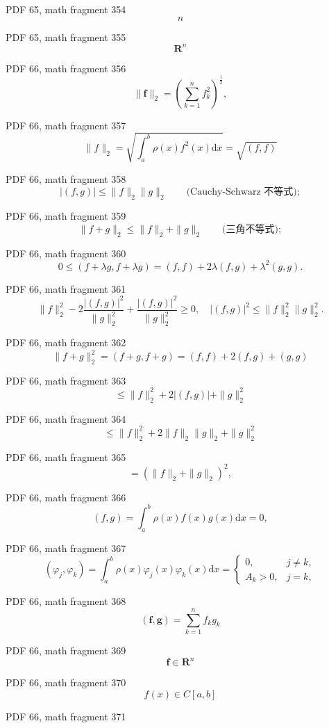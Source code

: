 \documentclass[UTF8,fontset=fandol]{ctexart}
\begin{document}
PDF 65, math fragment 354
\[n\]
\par
PDF 65, math fragment 355
\[\mathbf{R}^n\]
\par
PDF 66, math fragment 356
\[
\| \boldsymbol{f} \|_{2} = \left( \sum_{k=1}^{n} f_{k}^{2} \right)^{\frac{1}{2}},
\]
\par
PDF 66, math fragment 357
\[
\| f \|_{2} = \sqrt{\int_{a}^{b} \rho(x) f^{2}(x) \mathrm{d}x} = \sqrt{(f, f)} \tag{3.3.4}
\]
\par
PDF 66, math fragment 358
\[
|(f,g)|\leqslant\|f\|_2\|g\|_2\qquad\text{(Cauchy-Schwarz 不等式)};\tag{3.3.5}
\]
\par
PDF 66, math fragment 359
\[
\|f+g\|_2\leqslant\|f\|_2+\|g\|_2\qquad\text{(三角不等式)};\tag{3.3.6}
\]
\par
PDF 66, math fragment 360
\[
0 \leqslant (f + \lambda g, f + \lambda g) = (f, f) + 2\lambda(f, g) + \lambda^{2}(g, g).
\]
\par
PDF 66, math fragment 361
\[
\| f \|_{2}^{2} - 2 \frac{|(f, g)|^{2}}{\| g \|_{2}^{2}} + \frac{|(f, g)|^{2}}{\| g \|_{2}^{2}} \geqslant 0, \quad |(f, g)|^{2} \leqslant \| f \|_{2}^{2} \| g \|_{2}^{2}.
\]
\par
PDF 66, math fragment 362
\[
\| f + g \|_{2}^{2} = (f + g, f + g) = (f, f) + 2(f, g) + (g, g)
\]
\par
PDF 66, math fragment 363
\[
\leqslant \| f \|_{2}^{2} + 2 |(f, g)| + \| g \|_{2}^{2}
\]
\par
PDF 66, math fragment 364
\[
\leqslant \| f \|_{2}^{2} + 2 \| f \|_{2} \| g \|_{2} + \| g \|_{2}^{2}
\]
\par
PDF 66, math fragment 365
\[
= (\| f \|_{2} + \| g \|_{2})^{2},
\]
\par
PDF 66, math fragment 366
\[
(f, g) = \int_{a}^{b} \rho(x) f(x) g(x) \mathrm{d}x = 0, \tag{3.3.7}
\]
\par
PDF 66, math fragment 367
\[
(\varphi_{j}, \varphi_{k}) = \int_{a}^{b} \rho(x) \varphi_{j}(x) \varphi_{k}(x) \mathrm{d}x = \begin{cases} 0, & j \neq k, \\ A_{k} > 0, & j = k, \end{cases} \tag{3.3.8}
\]
\par
PDF 66, math fragment 368
\[(\boldsymbol{f}, \boldsymbol{g}) = \sum_{k=1}^{n} f_{k} g_{k}\]
\par
PDF 66, math fragment 369
\[\boldsymbol{f} \in \mathbf{R}^{n}\]
\par
PDF 66, math fragment 370
\[f(x) \in C[a, b]\]
\par
PDF 66, math fragment 371
\end{document}
